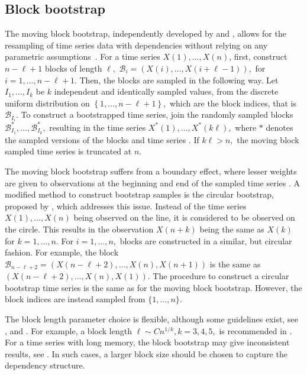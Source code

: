 \subsection{Block bootstrap}\label{block-bootstrap}

The moving block bootstrap, independently developed by \cite{Kunsch1989}
and \cite{Liu1992}, allows for the resampling of time series data with
dependencies without relying on any parametric
assumptions~\citep[Chapter~2.5]{Lahiri2003}. For a time series
\(X(1), \dots , X(n)\), first, construct \(n - \ell + 1\) blocks of
length \(\ell,\)
\(\mathcal{B}_{i} = \left( X(i), \dots , X(i + \ell - 1) \right),\) for
\(i = 1, \dots , n - \ell + 1.\) Then, the blocks are sampled in the
following way. Let \(I_{1}, \dots, I_{k}\) be \(k\) independent and
identically sampled values, from the discrete uniform distribution on
\(\left\{ 1,\dots, n - \ell + 1 \right\},\) which are the block indices,
that is \(\mathcal{B}_{I_{i}}.\) To construct a bootstrapped time
series, join the randomly sampled blocks
\(\mathcal{B}_{I_{1}}^{*}, \dots, \mathcal{B}_{I_{k}}^{*},\) resulting
in the time series \(X^{*}(1), \dots, X^{*}(k\ell),\) where \(*\)
denotes the sampled versions of the blocks and time series
\cite[Chapter~2.5]{Lahiri2003}. If \(k\ell>n,\) the moving block sampled
time series is truncated at \(n.\)

The moving block bootstrap suffers from a boundary effect, where lesser
weights are given to observations at the beginning and end of the
sampled time series \citep[Chapter~2.7]{Lahiri2003}. A modified method
to construct bootstrap samples is the circular bootstrap, proposed by
\cite{Politis1992}, which addresses this issue. Instead of the time
series \(X(1) , \dots , X(n)\) being observed on the line, it is
considered to be observed on the circle. This results in the observation
\(X(n + k)\) being the same as \(X(k)\) for \(k = 1, \dots , n.\) For
\(i = 1, \dots , n ,\) blocks are constructed in a similar, but circular
fashion. For example, the block
\(\mathcal{B}_{n - \ell + 2} = \left(X(n - \ell + 2) , \dots , X(n), X(n + 1) \right)\)
is the same as \(\left(X(n - \ell + 2) , \dots , X(n), X(1) \right) .\)
The procedure to construct a circular bootstrap time series is the same
as for the moving block bootstrap. However, the block indices are
instead sampled from \(\{1, \dots , n\}\).

The block length parameter choice is flexible, although some guidelines
exist, see \cite{Hall1995}, \cite{Politis2004} and \cite{Arteche2024}.
For example, a block length \(\ell \sim C n^{1/k}, k = 3, 4, 5,\) is
recommended in \citep{Hall1995}. For a time series with long memory, the
block bootstrap may give inconsistent results, see \cite{Lahiri1993}. In
such cases, a larger block size should be chosen to capture the
dependency structure.

